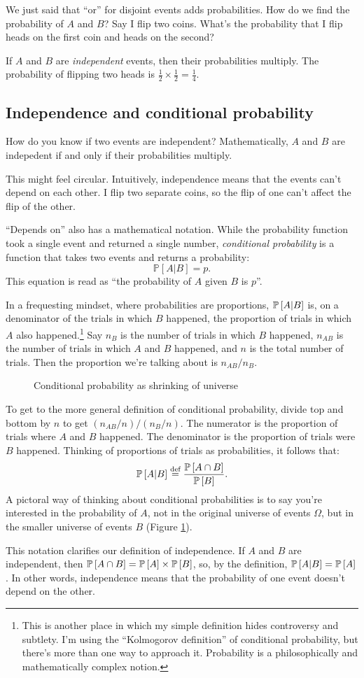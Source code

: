 We just said that ``or'' for disjoint events adds probabilities. How do we
find the probability of $A$ and $B$? Say I flip two coins. What's the
probability that I flip heads on the first coin and heads on the second?

If $A$ and $B$ are \emph{independent} events, then their probabilities
multiply. The probability of flipping two heads is $\tfrac{1}{2} \times
\tfrac{1}{2} = \tfrac{1}{4}$.

\subsection{Independence and conditional probability}

How do you know if two events are independent? Mathematically, $A$ and $B$
are indepedent if and only if their probabilities multiply.

This might feel circular. Intuitively, independence means that the events
can't depend on each other. I flip two separate coins, so the flip of one
can't affect the flip of the other.

``Depends on'' also has a mathematical notation. While the probability function
took a single event and returned a single number, \emph{conditional
probability} is a function that takes two events and returns a probability:
$$
\mathbb{P}[A | B] = p.
$$
This equation is read as ``the probability of $A$ given $B$ is $p$''.

In a frequesting mindset, where probabilities are proportions, $\mathbb{P}\left[{A | B}\right]$
is, on a denominator of the trials in which $B$ happened, the proportion of
trials  in which $A$ also happened.\footnote{This is another place in which my
simple definition hides controversy and subtlety. I'm using the ``Kolmogorov
definition'' of conditional probability, but there's more than one way to
approach it. Probability is a philosophically and mathematically complex notion.}
Say $n_B$ is the number of trials in which $B$ happened, $n_{AB}$ is the
number of trials in which $A$ and $B$ happened, and $n$ is the total number of
trials. Then the proportion we're talking about is $n_{AB} / n_B$.

\begin{figure}
\caption{Conditional probability as shrinking of universe}
\label{fig:conditional-probability}
\end{figure}

To get to the more general definition of conditional probability, divide top
and bottom by $n$ to get $(n_{AB}/n) / (n_B/n)$. The numerator is the
proportion of trials where $A$ and $B$ happened. The denominator is the
proportion of trials were $B$ happened. Thinking of proportions of trials as
probabilities, it follows that: $$ \mathbb{P}\left[{A | B}\right] \stackrel{\text{def}}{=} \frac{\mathbb{P}\left[{A \cap
B}\right]}{\mathbb{P}\left[{B}\right]}. $$ A pictoral way of thinking about conditional probabilities
is to say you're interested in the probability of $A$, not in the original
universe of events $\Omega$, but in the smaller universe of events $B$ (Figure
\ref{fig:conditional-probability}).

This notation clarifies our definition of independence. If $A$ and $B$ are
independent, then $\mathbb{P}\left[{A \cap B}\right] = \mathbb{P}\left[{A}\right] \times \mathbb{P}\left[{B}\right]$, so, by the
definition, $\mathbb{P}\left[{A | B}\right] = \mathbb{P}\left[{A}\right]$. In other words, independence means that
the probability of one event doesn't depend on the other.
